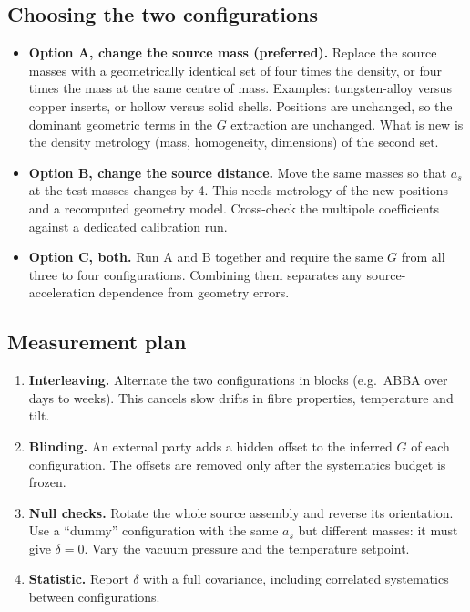 \documentclass[10pt]{article}
\begin{document}
\subsection*{Choosing the two configurations}
\begin{itemize}
\item \textbf{Option A, change the source mass (preferred).} Replace the source masses with a geometrically identical set of four times the density, or four times the mass at the same centre of mass. Examples: tungsten-alloy versus copper inserts, or hollow versus solid shells. Positions are unchanged, so the dominant geometric terms in the $G$ extraction are unchanged. What is new is the density metrology (mass, homogeneity, dimensions) of the second set.
\item \textbf{Option B, change the source distance.} Move the same masses so that $a_s$ at the test masses changes by 4. This needs metrology of the new positions and a recomputed geometry model. Cross-check the multipole coefficients against a dedicated calibration run.
\item \textbf{Option C, both.} Run A and B together and require the same $G$ from all three to four configurations. Combining them separates any source-acceleration dependence from geometry errors.
\end{itemize}

\subsection*{Measurement plan}
\begin{enumerate}
\item \textbf{Interleaving.} Alternate the two configurations in blocks (e.g.\ ABBA over days to weeks). This cancels slow drifts in fibre properties, temperature and tilt.
\item \textbf{Blinding.} An external party adds a hidden offset to the inferred $G$ of each configuration. The offsets are removed only after the systematics budget is frozen.
\item \textbf{Null checks.} Rotate the whole source assembly and reverse its orientation. Use a ``dummy'' configuration with the same $a_s$ but different masses: it must give $\delta=0$. Vary the vacuum pressure and the temperature setpoint.
\item \textbf{Statistic.} Report $\delta$ with a full covariance, including correlated systematics between configurations.
\end{enumerate}
\end{document}
